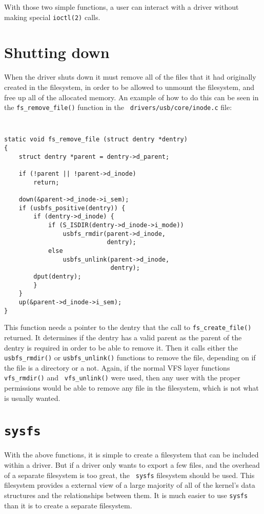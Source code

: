 \documentclass[twocolumn]{article}
\begin{document}
With those two simple functions, a user can interact with a driver without
making special {\tt ioctl(2)} calls.


\section{Shutting down}

When the driver shuts down it must remove all of the files that it had
originally created in the filesystem, in order to be allowed to unmount the
filesystem, and free up all of the allocated memory.  An example of how to
do this can be seen in the {\tt fs\_remove\_file()} function in the {\tt
drivers/usb/core/inode.c} file:
{\tt \small
\begin{verbatim}
static void fs_remove_file (struct dentry *dentry)
{
    struct dentry *parent = dentry->d_parent;

    if (!parent || !parent->d_inode)
        return;

    down(&parent->d_inode->i_sem);
    if (usbfs_positive(dentry)) {
        if (dentry->d_inode) {
            if (S_ISDIR(dentry->d_inode->i_mode))
                usbfs_rmdir(parent->d_inode,
                            dentry);
            else
                usbfs_unlink(parent->d_inode,
                             dentry);
        dput(dentry);
        }
    }
    up(&parent->d_inode->i_sem);
}
\end{verbatim}
}

This function needs a pointer to the dentry that the call to {\tt fs\_create\_file()}
returned.  It determines if the dentry has a valid parent as the parent of
the dentry is required in order to be able to remove it. Then it calls 
either the {\tt usbfs\_rmdir()} or {\tt usbfs\_unlink()} functions to
remove the file, depending on if the file is a directory or a not.  Again,
if the normal VFS layer functions {\tt vfs\_rmdir()} and {\tt
vfs\_unlink()} were used, then any user with the proper permissions would
be able to remove any file in the filesystem, which is not what is usually
wanted.

\section{\tt sysfs}

With the above functions, it is simple to create a filesystem that can be
included within a driver.  But if a driver only wants to export a few
files, and the overhead of a separate filesystem is too great, the {\tt
sysfs} filesystem should be used.  This filesystem provides a external view
of a large majority of all of the kernel's data structures and the
relationships between them.  It is much easier to use {\tt sysfs} than it
is to create a separate filesystem.
\end{document}
